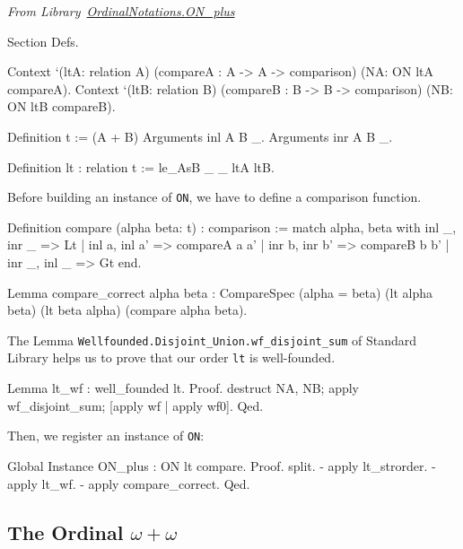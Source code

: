 \vspace{4pt}
\noindent\emph{From Library~\href{../theories/html/hydras.OrdinalNotations/ON_plus.html}{OrdinalNotations.ON\_plus}}


\begin{Coqsrc}
Section Defs.

  Context `(ltA: relation A)
          (compareA : A -> A -> comparison)
          (NA: ON ltA compareA).
  Context `(ltB: relation B)
          (compareB : B -> B -> comparison)
          (NB: ON ltB compareB).


Definition t := (A + B)%
Arguments inl  {A B} _.
Arguments inr  {A B} _.

Definition lt : relation t := le_AsB _ _ ltA ltB.
\end{Coqsrc}

Before building an instance of \texttt{ON}, we have to define a comparison function.


\begin{Coqsrc}
Definition compare (alpha beta: t) : comparison :=
   match alpha, beta with
     inl _, inr _ => Lt
   | inl a, inl a' => compareA a a'
   | inr b, inr b' => compareB b b'
   | inr _, inl _ => Gt
  end.

Lemma compare_correct alpha beta :
    CompareSpec (alpha = beta) (lt alpha beta) (lt beta alpha)
                            (compare alpha beta).
\end{Coqsrc}

The Lemma \texttt{Wellfounded.Disjoint\_Union.wf\_disjoint\_sum} of Standard Library
helps us to prove that our order \texttt{lt} is well-founded.

\begin{Coqsrc}
Lemma lt_wf : well_founded lt.
Proof. 
  destruct NA, NB; apply wf_disjoint_sum; [apply wf | apply wf0].
Qed.
\end{Coqsrc}

Then, we register an instance of \texttt{ON}:

\begin{Coqsrc}
Global Instance ON_plus : ON lt compare.
Proof.
  split.
  - apply lt_strorder.
  -  apply lt_wf.
  - apply compare_correct.
Qed.
\end{Coqsrc}






\subsection{The Ordinal \texorpdfstring{$\omega+\omega$}{omega + omega}}

